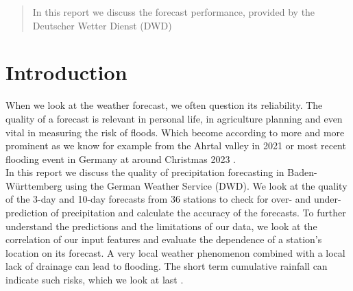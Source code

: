 \documentclass{article}
\theoremstyle{plain}
\theoremstyle{definition}
\theoremstyle{remark}
\begin{document}
\printAffiliationsAndNotice{\icmlEqualContribution} %

\begin{abstract}
In this report we discuss the forecast performance, provided by the Deutscher Wetter Dienst (DWD)


\end{abstract}

\section{Introduction}\label{sec:intro}
When we look at the weather forecast, we often question its reliability. The quality of a forecast is relevant in personal life, in agriculture planning and even vital in measuring the risk of floods. Which become according to \cite{FloodTrends} more and more prominent as we know for example from the Ahrtal valley in 2021 \cite{pink} or most recent flooding event in Germany at around Christmas 2023 \cite{flooding_christmas}. \\

In this report we discuss the quality of precipitation forecasting in Baden-Württemberg using the German Weather Service (DWD). 
We look at the quality of the 3-day and 10-day forecasts from 36 stations to check for over- and under-prediction of precipitation and calculate the accuracy of the forecasts. 
To further understand the predictions and the limitations of our data, we look at the correlation of our input features and evaluate the dependence of a station's location on its forecast. 
A very local weather phenomenon combined with a local lack of drainage can lead to flooding. The short term cumulative rainfall can indicate such risks, which we look at last \cite{pink}. %
\end{document}
